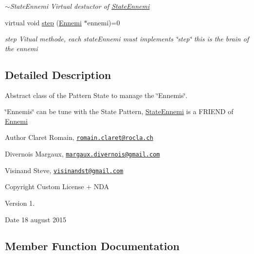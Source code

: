 \begin{DoxyCompactItemize}
\begin{DoxyCompactList}\small\item\em $\sim$\+State\+Ennemi Virtual destuctor of \hyperlink{class_state_ennemi}{State\+Ennemi} \end{DoxyCompactList}\item 
virtual void \hyperlink{class_state_ennemi_a8df87629876307ddb6cb241864bb8da8}{step} (\hyperlink{class_ennemi}{Ennemi} $\ast$ennemi)=0
\begin{DoxyCompactList}\small\item\em step Vitual methode, each state\+Ennemi must implements \char`\"{}step\char`\"{} this is the brain of the ennemi \end{DoxyCompactList}\end{DoxyCompactItemize}


\subsection{Detailed Description}
Abstract class of the Pattern State to manage the \char`\"{}\+Ennemis\char`\"{}. 

\char`\"{}\+Ennemis\char`\"{} can be tune with the State Pattern, \hyperlink{class_state_ennemi}{State\+Ennemi} is a F\+R\+I\+E\+N\+D of \hyperlink{class_ennemi}{Ennemi} \begin{DoxyAuthor}{Author}
Claret Romain, \href{mailto:romain.claret@rocla.ch}{\tt romain.\+claret@rocla.\+ch} 

Divernois Margaux, \href{mailto:margaux.divernois@gmail.com}{\tt margaux.\+divernois@gmail.\+com} 

Visinand Steve, \href{mailto:visinandst@gmail.com}{\tt visinandst@gmail.\+com} 
\end{DoxyAuthor}
\begin{DoxyCopyright}{Copyright}
Custom License + N\+D\+A 
\end{DoxyCopyright}
\begin{DoxyVersion}{Version}
1. 
\end{DoxyVersion}
\begin{DoxyDate}{Date}
18 august 2015 
\end{DoxyDate}


\subsection{Member Function Documentation}
\hypertarget{class_state_ennemi_a8df87629876307ddb6cb241864bb8da8}{}
